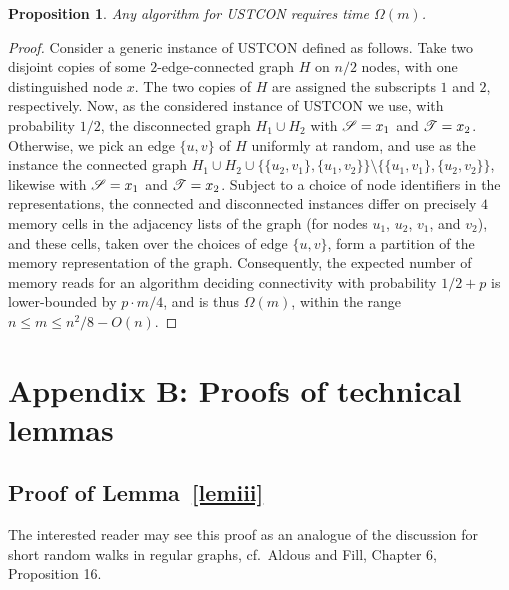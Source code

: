 \documentclass[11pt,a4paper]{article}
\newtheorem{proposition}{Proposition}
\newcommand{\s}{\ensuremath  \mathscr S}
\renewcommand{\t}{\ensuremath \mathscr  T}
\renewcommand{\*}{\hspace*{5mm}}
\begin{document}
\begin{proposition}\label{lbm}
Any algorithm for USTCON requires time $\Omega(m)$.
\end{proposition}
\begin{proof}
Consider a generic instance of USTCON defined as follows. Take two disjoint copies of some $2$-edge-connected graph $H$ on $n/2$ nodes, with one distinguished node $x$. The two copies of $H$ are assigned the subscripts $1$ and $2$, respectively. Now, as the considered instance of USTCON we use, with probability $1/2$, the disconnected graph $H_1 \cup H_2$ with $\s=x_1$ and $\t=x_2$. Otherwise, we pick an edge $\{u,v\}$ of $H$ uniformly at random, and use as the instance the connected graph $H_1 \cup H_2 \cup \{\{u_2,v_1\},\{u_1,v_2\}\}\setminus \{\{u_1,v_1\},\{u_2,v_2\}\}$, likewise with $\s=x_1$ and $\t=x_2$. Subject to a choice of node identifiers in the representations, the connected and disconnected instances differ on precisely $4$ memory cells in the adjacency lists of the graph (for nodes $u_1$, $u_2$, $v_1$, and $v_2$), and these cells, taken over the choices of edge $\{u,v\}$, form a partition of the memory representation of the graph. Consequently, the expected number of memory reads for an algorithm deciding connectivity with probability $1/2 +p$ is lower-bounded by $p \cdot m/4$, and is thus $\Omega(m)$, within the range $n \leq m \leq n^2/8-O(n)$.
\end{proof}


\section*{Appendix B: Proofs of technical lemmas}


\subsection*{Proof of Lemma~\ref{lemiii}}

The interested reader may see this proof as an analogue of the discussion for short random walks in regular graphs, cf.~Aldous and Fill, Chapter 6, Proposition 16.
\end{document}
